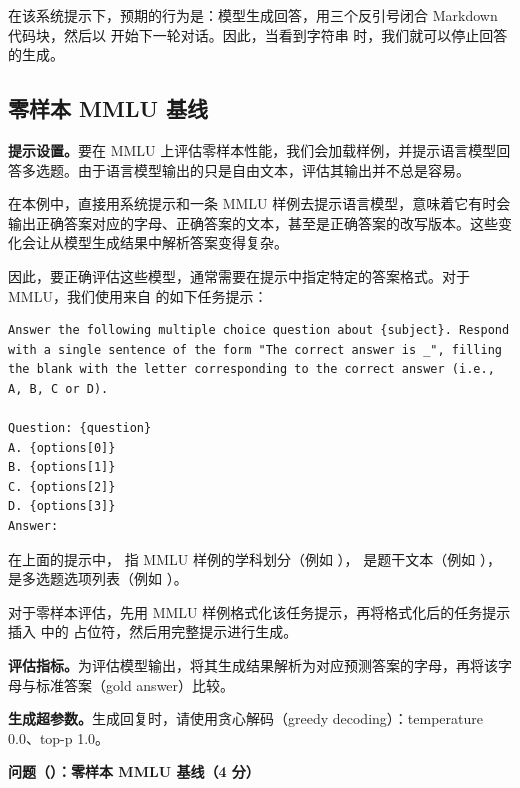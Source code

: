 在该系统提示下，预期的行为是：模型生成回答，用三个反引号闭合 Markdown 代码块，然后以  开始下一轮对话。因此，当看到字符串  时，我们就可以停止回答的生成。

\subsection{零样本 MMLU 基线}

\textbf{提示设置。}要在 MMLU 上评估零样本性能，我们会加载样例，并提示语言模型回答多选题。由于语言模型输出的只是自由文本，评估其输出并不总是容易。

在本例中，直接用系统提示和一条 MMLU 样例去提示语言模型，意味着它有时会输出正确答案对应的字母、正确答案的文本，甚至是正确答案的改写版本。这些变化会让从模型生成结果中解析答案变得复杂。

因此，要正确评估这些模型，通常需要在提示中指定特定的答案格式。对于 MMLU，我们使用来自  的如下任务提示：

\begin{lstlisting}
Answer the following multiple choice question about {subject}. Respond with a single sentence of the form "The correct answer is _", filling the blank with the letter corresponding to the correct answer (i.e., A, B, C or D).

Question: {question}
A. {options[0]}
B. {options[1]}
C. {options[2]}
D. {options[3]}
Answer:
\end{lstlisting}

在上面的提示中， 指 MMLU 样例的学科划分（例如 ）， 是题干文本（例如 ）， 是多选题选项列表（例如 ）。

对于零样本评估，先用 MMLU 样例格式化该任务提示，再将格式化后的任务提示插入  中的  占位符，然后用完整提示进行生成。

\textbf{评估指标。}为评估模型输出，将其生成结果解析为对应预测答案的字母，再将该字母与标准答案（gold answer）比较。

\textbf{生成超参数。}生成回复时，请使用贪心解码（greedy decoding）：temperature 0.0、top-p 1.0。

\medskip
\noindent\textbf{问题（）：零样本 MMLU 基线（4 分）}
\medskip

